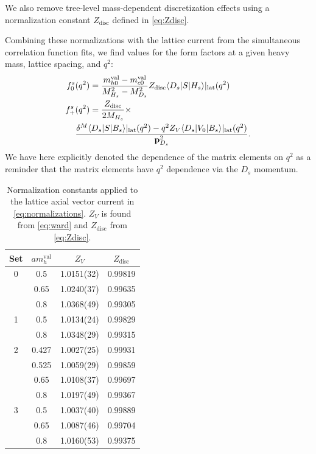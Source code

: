 We also remove tree-level mass-dependent discretization effects using a normalization constant $Z_{\text{disc}}$ defined in \eqref{eq:Zdisc}.

Combining these normalizations with the lattice current from the simultaneous correlation function fits, we find values for the form factors at a given heavy mass, lattice spacing, and $q^2$:
\begin{align}
  \nonumber
  f_0^s&(q^2) = {m^{\text{val}}_{h0} - m^{\text{val}}_{c0}\over M_{H_s}^2 - M_{D_s}^2 } Z_{\text{disc}} \langle D_s | S | H_s \rangle|_{\text{lat}}(q^2) \\
  \label{eq:normalizations}
  f_+^s&(q^2) = {Z_{\text{disc}} \over 2M_{H_s}} \times \\ \nonumber &{ \delta^M \langle D_s | S | B_s \rangle|_{\text{lat}}(q^2) - q^2 Z_V \langle D_s | V_0 | B_s \rangle|_{\text{lat}}(q^2) \over {\bf{p}}^2_{D_s}}.
\end{align}
We have here explicitly denoted the dependence of the matrix elements on $q^2$ as a reminder that the matrix elements have $q^2$ dependence via the $D_s$ momentum.

\begin{table}
\begin{center}
\begin{tabular}{ c c c c }
\hline
Set & $am_h^{\text{val}}$ & $Z_V$& $Z_{\text{disc}}$\\ [0.5ex]
\hline
0 & 0.5 & 1.0151(32) & 0.99819\\ [0.5ex] 
 & 0.65 & 1.0240(37) & 0.99635\\ [0.5ex] 
 & 0.8 & 1.0368(49) & 0.99305\\ [0.5ex] 
\hline
1 & 0.5 & 1.0134(24) & 0.99829\\ [0.5ex] 
 & 0.8 & 1.0348(29) & 0.99315\\ [0.5ex] 
\hline
2 & 0.427 & 1.0027(25) & 0.99931\\ [0.5ex] 
 & 0.525 & 1.0059(29) & 0.99859\\ [0.5ex] 
 & 0.65 & 1.0108(37) & 0.99697\\ [0.5ex] 
 & 0.8 & 1.0197(49) & 0.99367\\ [0.5ex] 
\hline
3 & 0.5 & 1.0037(40) & 0.99889\\ [0.5ex] 
 & 0.65 & 1.0087(46) & 0.99704\\ [0.5ex] 
 & 0.8 & 1.0160(53) & 0.99375\\ [0.5ex] 
\hline
\end{tabular}
    \caption{Normalization constants applied to the lattice axial vector current in \eqref{eq:normalizations}. $Z_V$ is found from \eqref{eq:ward} and $Z_{\text{disc}}$ from \eqref{eq:Zdisc}. \label{tab:norms}}
\end{center}
\end{table}

